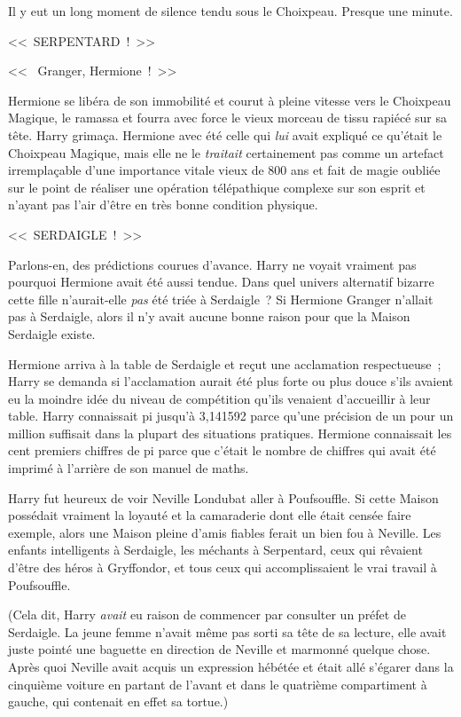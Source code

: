 Il y eut un long moment de silence tendu sous le Choixpeau. Presque une minute.

<<~SERPENTARD~!~>>

<<~ Granger, Hermione~!~>>

Hermione se libéra de son immobilité et courut à pleine vitesse vers le Choixpeau Magique, le ramassa et fourra avec force le vieux morceau de tissu rapiécé sur sa tête. Harry grimaça. Hermione avec été celle qui \emph{lui} avait expliqué ce qu'était le Choixpeau Magique, mais elle ne le \emph{traitait} certainement pas comme un artefact irremplaçable d'une importance vitale vieux de 800 ans et fait de magie oubliée sur le point de réaliser une opération télépathique complexe sur son esprit et n'ayant pas l'air d'être en très bonne condition physique.

<<~SERDAIGLE~!~>>

Parlons-en, des prédictions courues d'avance. Harry ne voyait vraiment pas pourquoi Hermione avait été aussi tendue. Dans quel univers alternatif bizarre cette fille n'aurait-elle \emph{pas} été triée à Serdaigle~? Si Hermione Granger n'allait pas à Serdaigle, alors il n'y avait aucune bonne raison pour que la Maison Serdaigle existe.

Hermione arriva à la table de Serdaigle et reçut une acclamation respectueuse~; Harry se demanda si l'acclamation aurait été plus forte ou plus douce s'ils avaient eu la moindre idée du niveau de compétition qu'ils venaient d'accueillir à leur table. Harry connaissait pi jusqu'à 3,141592 parce qu'une précision de un pour un million suffisait dans la plupart des situations pratiques. Hermione connaissait les cent premiers chiffres de pi parce que c'était le nombre de chiffres qui avait été imprimé à l'arrière de son manuel de maths.

Harry fut heureux de voir Neville Londubat aller à Poufsouffle. Si cette Maison possédait vraiment la loyauté et la camaraderie dont elle était censée faire exemple, alors une Maison pleine d'amis fiables ferait un bien fou à Neville. Les enfants intelligents à Serdaigle, les méchants à Serpentard, ceux qui rêvaient d'être des héros à Gryffondor, et tous ceux qui accomplissaient le vrai travail à Poufsouffle.

(Cela dit, Harry \emph{avait} eu raison de commencer par consulter un préfet de Serdaigle. La jeune femme n'avait même pas sorti sa tête de sa lecture, elle avait juste pointé une baguette en direction de Neville et marmonné quelque chose. Après quoi Neville avait acquis un expression hébétée et était allé s'égarer dans la cinquième voiture en partant de l'avant et dans le quatrième compartiment à gauche, qui contenait en effet sa tortue.)

